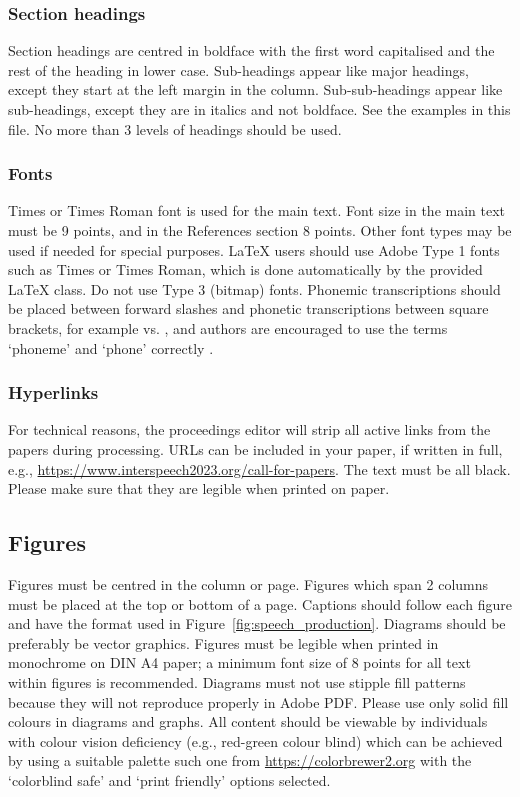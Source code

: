 \documentclass{INTERSPEECH2023}
\begin{document}
\subsubsection{Section headings}

Section headings are centred in boldface with the first word capitalised and the rest of the heading in lower case. Sub-headings appear like major headings, except they start at the left margin in the column. Sub-sub-headings appear like sub-headings, except they are in italics and not boldface. See the examples in this file. No more than 3 levels of headings should be used.

\subsubsection{Fonts}

Times or Times Roman font is used for the main text. Font size in the main text must be 9 points, and in the References section 8 points. Other font types may be used if needed for special purposes. \LaTeX\xspace users should use Adobe Type 1 fonts such as Times or Times Roman, which is done automatically by the provided \LaTeX\xspace class. Do not use Type 3 (bitmap) fonts. Phonemic transcriptions should be placed between forward slashes and phonetic transcriptions between square brackets, for example  vs. \textipa{[lO:r@nO:d@]}, and authors are encouraged to use the terms `phoneme' and `phone' correctly \cite{moore19_interspeech}.


\subsubsection{Hyperlinks}

For technical reasons, the proceedings editor will strip all active links from the papers during processing. URLs can be included in your paper, if written in full, e.g., \url{https://www.interspeech2023.org/call-for-papers}. The text must be all black. Please make sure that they are legible  when printed on paper.


\subsection{Figures}

Figures must be centred in the column or page. Figures which span 2 columns must be placed at the top or bottom of a page.
Captions should follow each figure and have the format used in Figure~\ref{fig:speech_production}. Diagrams should be preferably be vector graphics. Figures must be legible when printed in monochrome on DIN A4 paper; a minimum font size of  8 points for all text within figures is recommended. Diagrams must not use stipple fill patterns because they will not reproduce properly in Adobe PDF. Please use only solid fill colours in diagrams and graphs. All content should be viewable by individuals with colour vision deficiency (e.g., red-green colour blind) which can be achieved by using a suitable palette such one from \url{https://colorbrewer2.org} with the `colorblind safe' and `print friendly' options selected.
\end{document}
